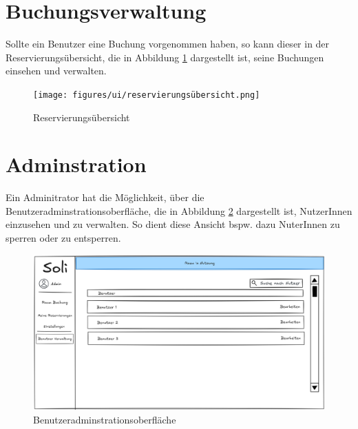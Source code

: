 \section{Buchungsverwaltung}
Sollte ein Benutzer eine Buchung vorgenommen haben, so kann dieser in der Reservierungsübersicht, die in Abbildung \ref{fig:overview} dargestellt ist, seine Buchungen einsehen und verwalten.

\begin{figure}[ht]
    \centering
    \texttt{[image: figures/ui/reservierungsübersicht.png]}
    \caption{Reservierungsübersicht}
    \label{fig:overview}
\end{figure}

\clearpage
\section{Adminstration}
Ein Adminitrator hat die Möglichkeit, über die Benutzeradminstrationsoberfläche, die in Abbildung \ref{fig:adminuser} dargestellt ist, NutzerInnen einzusehen und zu verwalten.
So dient diese Ansicht bspw. dazu NuterInnen zu sperren oder zu entsperren.

\begin{figure}[ht]
    \centering
    \includegraphics[scale=0.15]{figures/ui/useradminui.png}
    \caption{Benutzeradminstrationsoberfläche}
    \label{fig:adminuser}
\end{figure}

